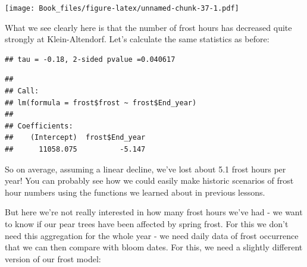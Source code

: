 \documentclass[
]{book}
\newenvironment{Shaded}{\begin{snugshade}}{\end{snugshade}}
\newcommand{\DataTypeTok}[1]{\textcolor[rgb]{0.13,0.29,0.53}{#1}}
\newcommand{\KeywordTok}[1]{\textcolor[rgb]{0.13,0.29,0.53}{\textbf{#1}}}
\newcommand{\NormalTok}[1]{#1}
\newcommand{\OperatorTok}[1]{\textcolor[rgb]{0.81,0.36,0.00}{\textbf{#1}}}
\begin{document}
\texttt{[image: Book\_files/figure-latex/unnamed-chunk-37-1.pdf]}

What we see clearly here is that the number of frost hours has decreased quite strongly at Klein-Altendorf. Let's calculate the same statistics as before:

\begin{Shaded}
\end{Shaded}

\begin{verbatim}
## tau = -0.18, 2-sided pvalue =0.040617
\end{verbatim}

\begin{Shaded}
\end{Shaded}

\begin{verbatim}
## 
## Call:
## lm(formula = frost$frost ~ frost$End_year)
## 
## Coefficients:
##    (Intercept)  frost$End_year  
##      11058.075          -5.147
\end{verbatim}

So on average, assuming a linear decline, we've lost about 5.1 frost hours per year! You can probably see how we could easily make historic scenarios of frost hour numbers using the functions we learned about in previous lessons.

But here we're not really interested in how many frost hours we've had - we want to know if our pear trees have been affected by spring frost. For this we don't need this aggregation for the whole year - we need daily data of frost occurrence that we can then compare with bloom dates. For this, we need a slightly different version of our frost model:
\end{document}
